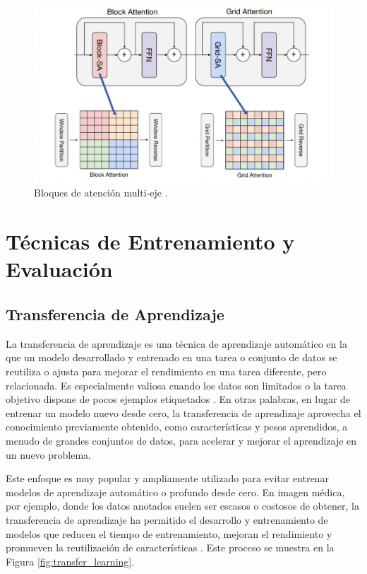 \documentclass[a4paper,10pt]{book}
\begin{document}
\begin{figure}[h!]
\centering
\includegraphics[width=0.6\linewidth]{reports//assets/multi_axis_attention.png}
\caption[Multi-Axis Attention Blocks]{Bloques de atención multi-eje \cite{noauthor_maxvit-unet_2024}.}
\label{fig:multi_axis_attention}
\end{figure}

\section{Técnicas de Entrenamiento y Evaluación}

\subsection{Transferencia de Aprendizaje}

La transferencia de aprendizaje es una técnica de aprendizaje automático en la que un modelo desarrollado y entrenado en una tarea o conjunto de datos se reutiliza o ajusta para mejorar el rendimiento en una tarea diferente, pero relacionada. Es especialmente valiosa cuando los datos son limitados o la tarea objetivo dispone de pocos ejemplos etiquetados \cite{murel_what_2024}. En otras palabras, en lugar de entrenar un modelo nuevo desde cero, la transferencia de aprendizaje aprovecha el conocimiento previamente obtenido, como características y pesos aprendidos, a menudo de grandes conjuntos de datos, para acelerar y mejorar el aprendizaje en un nuevo problema.

Este enfoque es muy popular y ampliamente utilizado para evitar entrenar modelos de aprendizaje automático o profundo desde cero. En imagen médica, por ejemplo, donde los datos anotados suelen ser escasos o costosos de obtener, la transferencia de aprendizaje ha permitido el desarrollo y entrenamiento de modelos que reducen el tiempo de entrenamiento, mejoran el rendimiento y promueven la reutilización de características \cite{matsoukas_what_2022}. Este proceso se muestra en la Figura \ref{fig:transfer_learning}.
\end{document}
